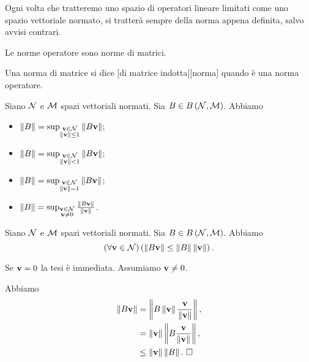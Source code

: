 \par Ogni volta che tratteremo uno spazio di operatori lineare limitati come uno spazio vettoriale normato, si tratter\`a sempre della norma appena definita, salvo avvisi contrari.
\begin{Theorem}
	Le norme operatore sono norme di matrici.
\end{Theorem}
\begin{Definition}
	Una norma di matrice si dice [di matrice indotta][norma] quando \`e una norma operatore.
\end{Definition}
\begin{Theorem}
	Siano $\mathcal{N}$ e $\mathcal{M}$ spazi vettoriali normati.
  Sia
  $B \in
    B \left ( \mathcal{N} , \mathcal{M} \right )$.
  Abbiamo
	\begin{itemize}
		\item $\Norm{\BoundedLinearOperator} = \sup_{\substack{\Vector \in \NormedSpace\\\Norm{\Vector} \leq 1}} \Norm{\BoundedLinearOperator \Vector}$;
		\item $\Norm{\BoundedLinearOperator} = \sup_{\substack{\Vector \in \NormedSpace\\\Norm{\Vector} < 1}} \Norm{\BoundedLinearOperator \Vector}$;
		\item $\Norm{\BoundedLinearOperator} = \sup_{\substack{\Vector \in \NormedSpace\\\Norm{\Vector} = 1}} \Norm{\BoundedLinearOperator \Vector}$;
		\item $\Norm{\BoundedLinearOperator} = \sup_{\substack{\Vector \in \NormedSpace\\\Vector \neq 0}} \frac{\Norm{\BoundedLinearOperator \Vector}}{\Norm{\Vector}}$.
	\end{itemize}
\end{Theorem}
\begin{Corollary}
	Siano $\mathcal{N}$ e $\mathcal{M}$ spazi vettoriali normati.
  Sia
  $B \in
    B \left ( \mathcal{N} , \mathcal{M} \right )$.
  Abbiamo
  \[
    \ForAll{\Vector \in \NormedSpace}{
      \Norm{\BoundedLinearOperator \Vector} \leq
      \Norm{\BoundedLinearOperator} \Norm{\Vector}}.
  \]
\end{Corollary}
\Proof Se $\mathbf{v} = 0$ la tesi \`e immediata. Assumiamo $\mathbf{v} \neq 0$.
\par Abbiamo
\begin{align*}
  \Norm{\BoundedLinearOperator \Vector}
  &= \Norm{\BoundedLinearOperator
    \Norm{\Vector} \frac{\Vector}{\Norm{\Vector}}},\\
  &= \Norm{\Vector}
    \Norm{\BoundedLinearOperator \frac{\Vector}{\Norm{\Vector}}},\\
  &\leq \Norm{\Vector} \Norm{\BoundedLinearOperator}.\text{ \EndProof}
\end{align*}
